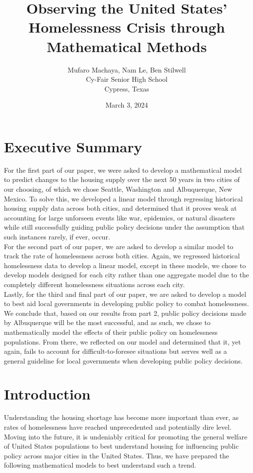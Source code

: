 \documentclass[12pt]{article}
\title{Observing the United States' Homelessness Crisis through Mathematical Methods}
\author{Mufaro Machaya, Nam Le, Ben Stilwell \\ Cy-Fair Senior High School \\ Cypress, Texas}
\date{March 3, 2024}
\begin{document}
\newpage

\section*{Executive Summary}
For the first part of our paper, we were asked to develop a mathematical model to predict changes to the housing
supply over the next 50 years in two cities of our choosing, of which we chose Seattle, Washington and Albuquerque,
New Mexico. To solve this, we developed a linear model through regressing historical housing supply data across both
cities, and determined that it proves weak at accounting for large unforseen events like war, epidemics, or natural
disasters while still successfully guiding public policy decisions under the assumption that such instances rarely, if
ever, occur. \\

\noindent
For the second part of our paper, we are asked to develop a similar model to track the rate of homelessness across
both cities. Again, we regressed historical homelessness data to develop a linear model, except in these models, we
chose to develop models designed for each city rather than one aggregate model due to the completely different
homelessness situations across each city. \\

\noindent
Lastly, for the third and final part of our paper, we are asked to develop a model to best aid local governments in
developing public policy to combat homelessness. We conclude that, based on our results from part 2, public policy
decisions made by Albuquerque will be the most successful, and as such, we chose to mathematically model the effects
of their public policy on homelessness populations. From there, we reflected on our model and determined that it, yet
again, fails to account for difficult-to-foresee situations but serves well as a general guideline for local
governments when developing public policy decisions.

\maketitle
\newpage
\tableofcontents

\newpage

\section{Introduction}
Understanding the housing shortage has become more important than ever, as rates of homelessness have reached
unprecedented and potentially dire level\cite{NPR-ABGC-2022}. Moving into the future, it is
undeniably critical for promoting the general welfare of United States populations to best understand housing for
influencing public policy across major cities in the United States. Thus, we have prepared the following mathematical
models to best understand such a trend.
\end{document}

